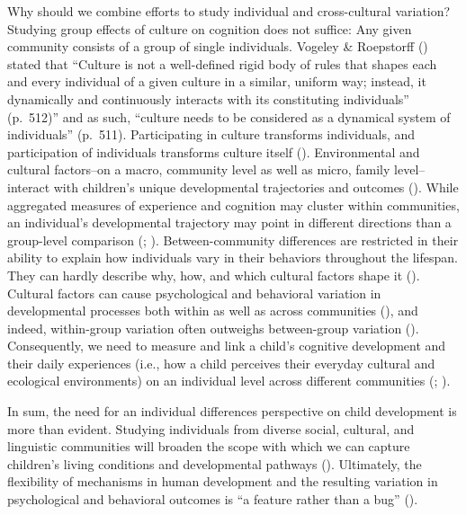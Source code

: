 \documentclass[
]{scrbook}
\begin{document}
Why should we combine efforts to study individual and cross-cultural variation? Studying group effects of culture on cognition does not suffice: Any given community consists of a group of single individuals. Vogeley \& Roepstorff () stated that ``Culture is not a well-defined rigid body of rules that shapes each and every individual of a given culture in a similar, uniform way; instead, it dynamically and continuously interacts with its constituting individuals'' (p.~512)'' and as such, ``culture needs to be considered as a dynamical system of individuals'' (p.~511). Participating in culture transforms individuals, and participation of individuals transforms culture itself (). Environmental and cultural factors\thinspace --\thinspace on a macro, community level as well as micro, family level\thinspace --\thinspace interact with children's unique developmental trajectories and outcomes (). While aggregated measures of experience and cognition may cluster within communities, an individual's developmental trajectory may point in different directions than a group-level comparison (; ). Between-community differences are restricted in their ability to explain how individuals vary in their behaviors throughout the lifespan. They can hardly describe why, how, and which cultural factors shape it (). Cultural factors can cause psychological and behavioral variation in developmental processes both within as well as across communities (), and indeed, within-group variation often outweighs between-group variation (). Consequently, we need to measure and link a child's cognitive development and their daily experiences (i.e., how a child perceives their everyday cultural and ecological environments) on an individual level across different communities (; ).

In sum, the need for an individual differences perspective on child development is more than evident. Studying individuals from diverse social, cultural, and linguistic communities will broaden the scope with which we can capture children's living conditions and developmental pathways (). Ultimately, the flexibility of mechanisms in human development and the resulting variation in psychological and behavioral outcomes is ``a feature rather than a bug'' ().
\end{document}
